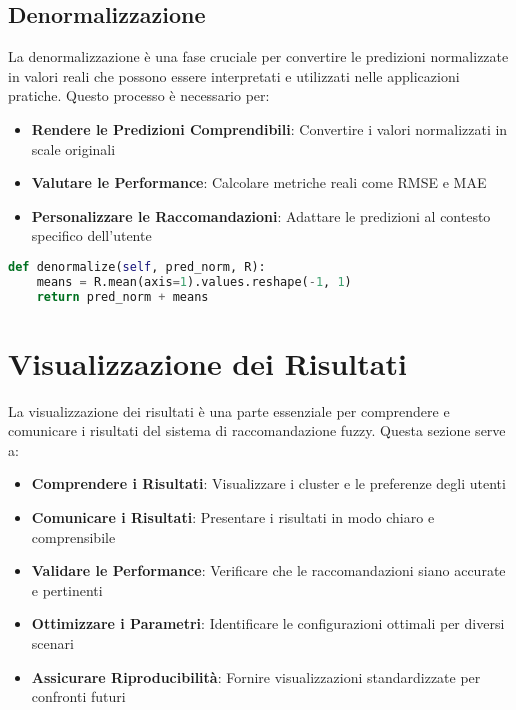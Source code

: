 \subsection{Denormalizzazione}

La denormalizzazione è una fase cruciale per convertire le predizioni normalizzate in valori reali che possono essere interpretati e utilizzati nelle applicazioni pratiche. Questo processo è necessario per:
\begin{itemize}
    \item \textbf{Rendere le Predizioni Comprendibili}: Convertire i valori normalizzati in scale originali
    \item \textbf{Valutare le Performance}: Calcolare metriche reali come RMSE e MAE
    \item \textbf{Personalizzare le Raccomandazioni}: Adattare le predizioni al contesto specifico dell'utente
\end{itemize}

\begin{lstlisting}[language=Python, caption=Denormalizzazione]
def denormalize(self, pred_norm, R):
    means = R.mean(axis=1).values.reshape(-1, 1)
    return pred_norm + means
\end{lstlisting}

\section{Visualizzazione dei Risultati}

La visualizzazione dei risultati è una parte essenziale per comprendere e comunicare i risultati del sistema di raccomandazione fuzzy. Questa sezione serve a:

\begin{itemize}
    \item \textbf{Comprendere i Risultati}: Visualizzare i cluster e le preferenze degli utenti
    \item \textbf{Comunicare i Risultati}: Presentare i risultati in modo chiaro e comprensibile
    \item \textbf{Validare le Performance}: Verificare che le raccomandazioni siano accurate e pertinenti
    \item \textbf{Ottimizzare i Parametri}: Identificare le configurazioni ottimali per diversi scenari
    \item \textbf{Assicurare Riproducibilità}: Fornire visualizzazioni standardizzate per confronti futuri
\end{itemize}

